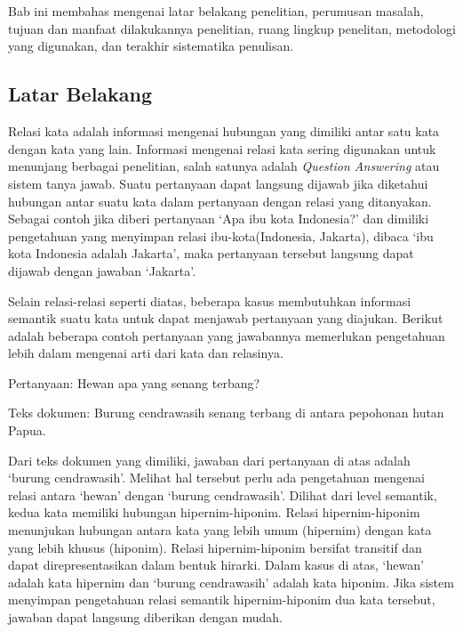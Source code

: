 \chapter{\babSatu}
Bab ini membahas mengenai latar belakang penelitian, perumusan masalah, tujuan dan manfaat dilakukannya penelitian, ruang lingkup penelitan, metodologi yang digunakan, dan terakhir sistematika penulisan. 


\section{Latar Belakang}
Relasi kata adalah informasi mengenai hubungan yang dimiliki antar satu kata dengan kata yang lain. Informasi mengenai relasi kata sering digunakan untuk menunjang berbagai penelitian, salah satunya adalah \textit{Question Answering} atau sistem tanya jawab. Suatu pertanyaan dapat langsung dijawab jika diketahui hubungan antar suatu kata dalam pertanyaan dengan relasi yang ditanyakan. Sebagai contoh jika diberi pertanyaan `Apa ibu kota Indonesia?' dan dimiliki pengetahuan yang menyimpan relasi ibu-kota(Indonesia, Jakarta), dibaca `ibu kota Indonesia adalah Jakarta', maka pertanyaan tersebut langsung dapat dijawab dengan jawaban `Jakarta'.

Selain relasi-relasi seperti diatas, beberapa kasus membutuhkan informasi semantik suatu kata untuk dapat menjawab pertanyaan yang diajukan. Berikut adalah beberapa contoh pertanyaan yang jawabannya memerlukan pengetahuan lebih dalam mengenai arti dari kata dan relasinya.

Pertanyaan: Hewan apa yang senang terbang?

Teks dokumen: Burung cendrawasih senang terbang di antara pepohonan hutan Papua.

Dari teks dokumen yang dimiliki, jawaban dari pertanyaan di atas adalah `burung cendrawasih'. Melihat hal tersebut perlu ada pengetahuan mengenai relasi antara `hewan' dengan `burung cendrawasih'. Dilihat dari level semantik, kedua kata memiliki hubungan hipernim-hiponim. Relasi hipernim-hiponim menunjukan hubungan antara kata yang lebih umum (hipernim) dengan kata yang lebih khusus (hiponim). Relasi hipernim-hiponim bersifat transitif dan dapat direpresentasikan dalam bentuk hirarki. Dalam kasus di atas, `hewan' adalah kata hipernim dan `burung cendrawasih' adalah kata hiponim. Jika sistem menyimpan pengetahuan relasi semantik hipernim-hiponim dua kata tersebut, jawaban dapat langsung diberikan dengan mudah.

